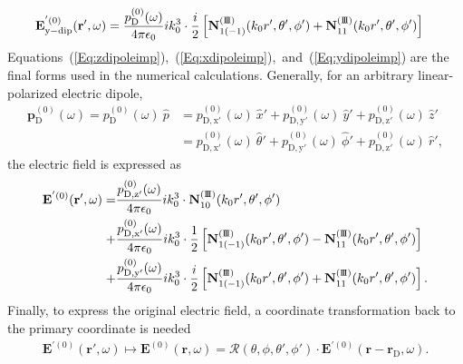 \documentclass[journal=jacsat,manuscript=article,layout=traditional]{achemso}
\newcommand{\joinR}{\hspace{-.17em}}
\newcommand{\RomanI}{\scriptsize\textrm{I}}
\newcommand{\RomanIII}{\mbox{\RomanI\joinR\RomanI\joinR\RomanI}}
\begin{document}
\begin{align}
    \mathbf{E}_\mathrm{y-dip}^{'(0)}(\mathbf{r}',\omega)
    &=\frac{p_\mathrm{D}^{(0)}(\omega)}{4\pi\epsilon_0}ik_0^3
    \cdot\frac{i}{2}\left[
    \mathbf{N}_{\mathstrut{1(-1)}}^{(\RomanIII)}(k_0r',\theta',\phi')+
    \mathbf{N}_{\mathstrut{11}}^{(\RomanIII)}(k_0r',\theta',\phi')
    \right]
    \label{Eq:ydipoleimp}
\end{align}
Equations~(\ref{Eq:zdipoleimp}),~(\ref{Eq:xdipoleimp}),~and~(\ref{Eq:ydipoleimp}) are the final forms used in the numerical calculations. 
Generally, for an arbitrary linear-polarized electric dipole,
\begin{align}
    \mathbf{p}_\mathrm{D}^{(0)}(\omega)=p_\mathrm{D}^{(0)}(\omega)~\hat{p}
    &=p_\mathrm{D,x'}^{(0)}(\omega)~\hat{x}'+p_\mathrm{D,y'}^{(0)}(\omega)~\hat{y}'+p_\mathrm{D,z'}^{(0)}(\omega)~\hat{z}'\\
    \label{Eq:pspherical}
    &=p_\mathrm{D,x'}^{(0)}(\omega)~\hat{\theta}'+p_\mathrm{D,y'}^{(0)}(\omega)~\hat{\phi}'+p_\mathrm{D,z'}^{(0)}(\omega)~\hat{r}',
\end{align}
the electric field is expressed as
\begin{align}
    \nonumber
    \mathbf{E}^{'(0)}(\mathbf{r}',\omega)=&
    \frac{p_\mathrm{D,z'}^{(0)}(\omega)}{4\pi\epsilon_0}ik_0^3\cdot\mathbf{N}_{\mathstrut{10}}^{(\RomanIII)}(k_0r',\theta',\phi')\vphantom{\frac{1}{2}}\\
    \nonumber
    +&\frac{p_\mathrm{D,x'}^{(0)}(\omega)}{4\pi\epsilon_0}ik_0^3\cdot
    \frac{1}{2}\left[
    \mathbf{N}_{\mathstrut{1(-1)}}^{(\RomanIII)}(k_0r',\theta',\phi')-
    \mathbf{N}_{\mathstrut{11}}^{(\RomanIII)}(k_0r',\theta',\phi')
    \right]\\
    +&\frac{p_\mathrm{D,y'}^{(0)}(\omega)}{4\pi\epsilon_0}ik_0^3\cdot
    \frac{i}{2}\left[
    \mathbf{N}_{\mathstrut{1(-1)}}^{(\RomanIII)}(k_0r',\theta',\phi')+
    \mathbf{N}_{\mathstrut{11}}^{(\RomanIII)}(k_0r',\theta',\phi')
    \right].
    \label{Eq:arbitrarydip}
\end{align}
Finally, to express the original electric field, a coordinate transformation back to the primary coordinate is needed
\begin{align}
    \mathbf{E}^{'(0)}(\mathbf{r}',\omega)\longmapsto\mathbf{E}^{(0)}(\mathbf{r},\omega)=\mathcal{R}(\theta,\phi,\theta',\phi')\cdot\mathbf{E}^{'(0)}(\mathbf{r}-\mathbf{r}_\mathrm{D},\omega).
\end{align}
\end{document}
